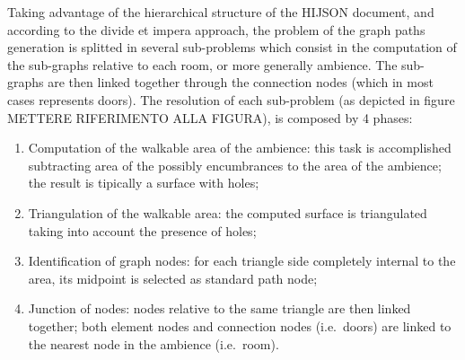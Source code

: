 \documentclass{sig-alternate}
\begin{document}
Taking advantage of the hierarchical structure of the HIJSON document,
and according to the divide et impera approach, the problem of the graph
paths generation is splitted in several sub-problems which consist in
the computation of the sub-graphs relative to each room, or more
generally ambience. The sub-graphs are then linked together through the
connection nodes (which in most cases represents doors). The resolution
of each sub-problem (as depicted in figure METTERE RIFERIMENTO ALLA
FIGURA), is composed by 4 phases:

\begin{enumerate}
\def\labelenumi{\arabic{enumi}.}
\itemsep1pt\parskip0pt
\item
  Computation of the walkable area of the ambience: this task is
  accomplished subtracting area of the possibly encumbrances to the area
  of the ambience; the result is tipically a surface with holes;
\item
  Triangulation of the walkable area: the computed surface is
  triangulated taking into account the presence of holes;
\item
  Identification of graph nodes: for each triangle side completely
  internal to the area, its midpoint is selected as standard path node;
\item
  Junction of nodes: nodes relative to the same triangle are then linked
  together; both element nodes and connection nodes (i.e.~doors) are
  linked to the nearest node in the ambience (i.e.~room).
\end{enumerate}
\end{document}
